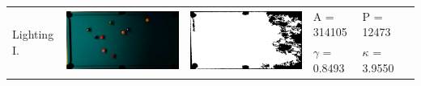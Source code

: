 \begin{tabular}{|l|c|c|l|l|c|}
\multirow{2}{*}{Lighting I.} & \multirow{2}{*}{\includegraphics[scale=0.05]{../images/1/7_img.png}} & \multirow{2}{*}{\includegraphics[scale=0.05]{../images/1/7_mask.png}} & A = 314105 & P = 12473 & \multirow{2}{*}{}\\ 
& & & $\gamma$ = 0.8493 & $\kappa$ = 3.9550 & \\
\hline


\end{tabular}
